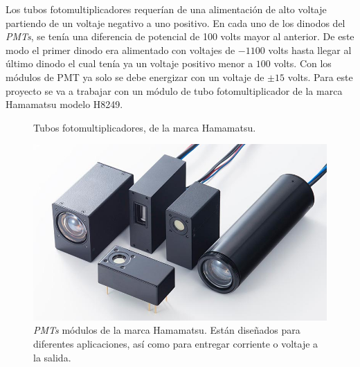 Los tubos fotomultiplicadores requerían de una alimentación de alto voltaje partiendo de un voltaje negativo a uno positivo. En cada uno de los dinodos del \textit{PMTs}, se tenía una diferencia de potencial de 100 volts mayor al anterior. De este modo el primer dinodo era alimentado con voltajes de $-1100$ volts hasta llegar al último dinodo el cual tenía ya un voltaje positivo menor a $100$ volts.
Con los módulos de PMT ya solo se debe energizar con un voltaje de $\pm 15$ volts. Para este proyecto se va a trabajar con un módulo de tubo fotomultiplicador de la marca Hamamatsu modelo H8249.

\begin{figure}
	\centering
	\caption[Tubos fotomultiplicadores]{Tubos fotomultiplicadores, de la marca Hamamatsu. \cite{Hamamatsu2007}}
	\label{fig:PMT}
\end{figure}

\begin{figure}
	\centering
	\includegraphics[width=0.7\linewidth]{Imagenes/2/PMTmodule}
	\caption{\textit{PMTs} módulos de la marca Hamamatsu. Están diseñados para diferentes aplicaciones, así como para entregar corriente o voltaje a la salida. \cite{Hamamatsu2007}}
	\label{fig:pmtModule}
\end{figure}



